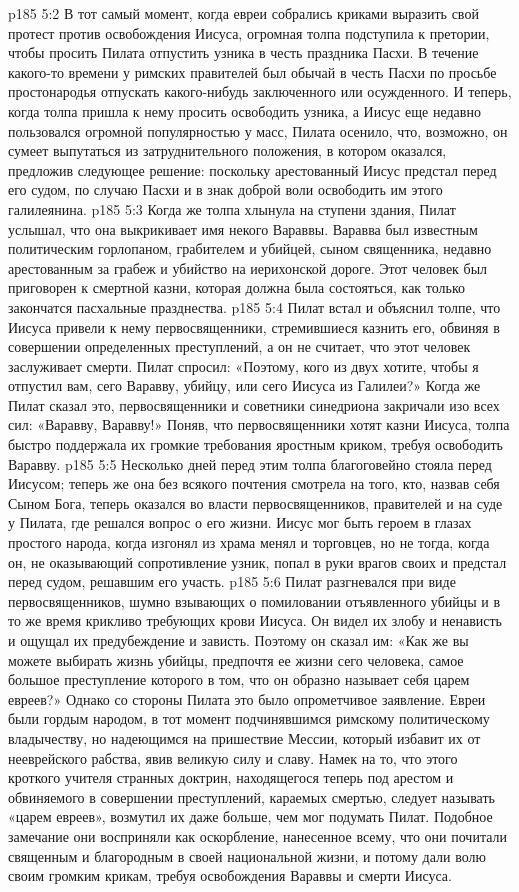 \vs p185 5:2 В тот самый момент, когда евреи собрались криками выразить свой протест против освобождения Иисуса, огромная толпа подступила к претории, чтобы просить Пилата отпустить узника в честь праздника Пасхи. В течение какого\hyp{}то времени у римских правителей был обычай в честь Пасхи по просьбе простонародья отпускать какого\hyp{}нибудь заключенного или осужденного. И теперь, когда толпа пришла к нему просить освободить узника, а Иисус еще недавно пользовался огромной популярностью у масс, Пилата осенило, что, возможно, он сумеет выпутаться из затруднительного положения, в котором оказался, предложив следующее решение: поскольку арестованный Иисус предстал перед его судом, по случаю Пасхи и в знак доброй воли освободить им этого галилеянина.
\vs p185 5:3 Когда же толпа хлынула на ступени здания, Пилат услышал, что она выкрикивает имя некого Вараввы. Варавва был известным политическим горлопаном, грабителем и убийцей, сыном священника, недавно арестованным за грабеж и убийство на иерихонской дороге. Этот человек был приговорен к смертной казни, которая должна была состояться, как только закончатся пасхальные празднества.
\vs p185 5:4 Пилат встал и объяснил толпе, что Иисуса привели к нему первосвященники, стремившиеся казнить его, обвиняя в совершении определенных преступлений, а он не считает, что этот человек заслуживает смерти. Пилат спросил: «Поэтому, кого из двух хотите, чтобы я отпустил вам, сего Варавву, убийцу, или сего Иисуса из Галилеи?» Когда же Пилат сказал это, первосвященники и советники синедриона закричали изо всех сил: «Варавву, Варавву!» Поняв, что первосвященники хотят казни Иисуса, толпа быстро поддержала их громкие требования яростным криком, требуя освободить Варавву.
\vs p185 5:5 Несколько дней перед этим толпа благоговейно стояла перед Иисусом; теперь же она без всякого почтения смотрела на того, кто, назвав себя Сыном Бога, теперь оказался во власти первосвященников, правителей и на суде у Пилата, где решался вопрос о его жизни. Иисус мог быть героем в глазах простого народа, когда изгонял из храма менял и торговцев, но не тогда, когда он, не оказывающий сопротивление узник, попал в руки врагов своих и предстал перед судом, решавшим его участь.
\vs p185 5:6 Пилат разгневался при виде первосвященников, шумно взывающих о помиловании отъявленного убийцы и в то же время крикливо требующих крови Иисуса. Он видел их злобу и ненависть и ощущал их предубеждение и зависть. Поэтому он сказал им: «Как же вы можете выбирать жизнь убийцы, предпочтя ее жизни сего человека, самое большое преступление которого в том, что он образно называет себя царем евреев?» Однако со стороны Пилата это было опрометчивое заявление. Евреи были гордым народом, в тот момент подчинявшимся римскому политическому владычеству, но надеющимся на пришествие Мессии, который избавит их от нееврейского рабства, явив великую силу и славу. Намек на то, что этого кроткого учителя странных доктрин, находящегося теперь под арестом и обвиняемого в совершении преступлений, караемых смертью, следует называть «царем евреев», возмутил их даже больше, чем мог подумать Пилат. Подобное замечание они восприняли как оскорбление, нанесенное всему, что они почитали священным и благородным в своей национальной жизни, и потому дали волю своим громким крикам, требуя освобождения Вараввы и смерти Иисуса.
